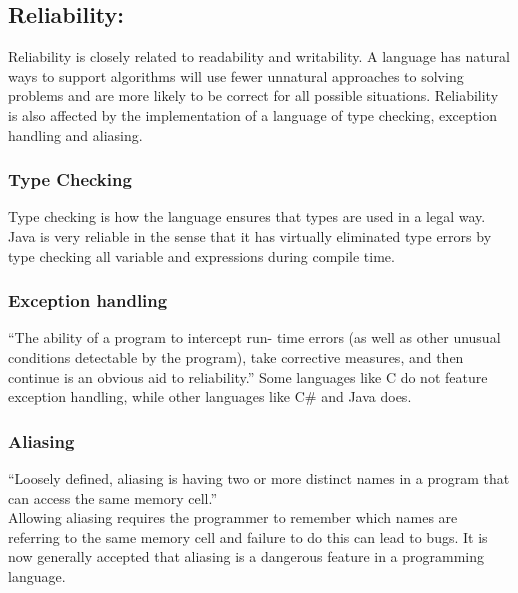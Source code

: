 \subsection*{Reliability:}
Reliability is closely related to readability and writability. A language has natural ways to support algorithms will use fewer unnatural approaches to solving problems and are more likely to be correct for all possible situations.
Reliability is also affected by the implementation of a language of type checking, exception handling and aliasing.
\subsubsection*{Type Checking}
Type checking is how the language ensures that types are used in a legal way. Java is very reliable in the sense that it has virtually eliminated type errors by type checking all variable and expressions during compile time.
\subsubsection*{Exception handling}
“The ability of a program to intercept run- time errors (as well as other
unusual conditions detectable by the program), take corrective measures, and
then continue is an obvious aid to reliability.”
Some languages like C do not feature exception handling, while other languages like C\# and Java does.
\subsubsection*{Aliasing}
“Loosely defined, aliasing is having two or more distinct names in a program that can access the same memory cell.” \\
Allowing aliasing requires the programmer to remember which names are referring to the same memory cell and failure to do this can lead to bugs. It is now generally accepted that aliasing is a dangerous feature in a programming language.




